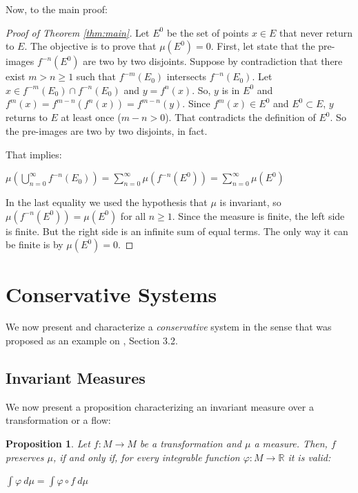 \documentclass[a4paper,12pt] {article}
\newtheorem{proposition}{Proposition}[section]
\begin{document}
 Now, to the main proof:

\begin{proof}[Proof of Theorem \ref{thm:main}]
Let $E^0$ be the set of points $x \in E$ that never return to $E$. The objective is to prove that $\mu(E^0) = 0$. First, let state that the pre-images $f^{-n}(E^0)$ are two by two disjoints. Suppose by contradiction that there exist $m>n\geq1$ such that $f^{-m}(E_0)$ intersects $f^{-n}(E_0)$. Let $x \in f^{-m}(E_0) \cap f^{-n}(E_0)$ and $y = f^n(x)$. So, $y$ is in $E^0$ and $f^m(x) = f^{m-n}(f^n(x)) = f^{m-n}(y)$. Since $f^m(x) \in E^0$ and $E^0 \subset E$, $y$ returns to $E$ at least once ($m-n>0$). That contradicts the definition of $E^0$. So the pre-images are two by two disjoints, in fact.

 That implies:

\begin{center}
    $\mu(\displaystyle \bigcup_{n=0}^\infty f^{-n}(E_0)) = \displaystyle \sum_{n=0}^\infty \mu(f^{-n}(E^0)) = \displaystyle \sum_{n=0}^\infty \mu(E^0)$
\end{center}

 In the last equality we used the hypothesis that $\mu$ is invariant, so $\mu(f^{-n}(E^0)) = \mu(E^0)$ for all $n\geq1$. Since the measure is finite, the left side is finite. But the right side is an infinite sum of equal terms. The only way it can be finite is by $\mu(E^0) = 0$.
\end{proof}

\section{Conservative Systems}

We now present and characterize a \textit{conservative} system in the sense that was proposed as an example on \cite{Krerley}, Section 3.2.

\subsection{Invariant Measures}

We now present a proposition characterizing an invariant measure over a transformation or a flow:

\begin{proposition}
    Let $f : M \to M$ be a transformation and $\mu$ a measure. Then, $f$ preserves $\mu$, if and only if, for every integrable function $\varphi : M \to \mathbb{R}$ it is valid: 

\begin{center}
    $\displaystyle \int \varphi\ d\mu = \displaystyle \int \varphi \circ f\ d\mu$
\end{center}
\end{proposition}
\end{document}
